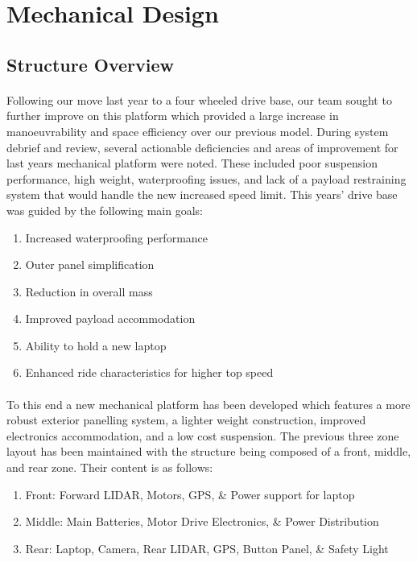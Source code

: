 \section{Mechanical Design}

\subsection{Structure Overview}
\paragraph{}
Following our move last year to a four wheeled drive base, our team sought to further improve on this platform which provided a large increase in manoeuvrability and space efficiency over our previous model. During system debrief and review, several actionable deficiencies and areas of improvement for last years mechanical platform were noted. These included poor suspension performance, high weight, waterproofing issues, and lack of a payload restraining system that would handle the new increased speed limit. This years' drive base was guided by the following main goals:

\begin{enumerate}
\item Increased waterproofing performance
\item Outer panel simplification
\item Reduction in overall mass
\item Improved payload accommodation
\item Ability to hold a new laptop
\item Enhanced ride characteristics for higher top speed
\end{enumerate}

\paragraph{}
To this end a new mechanical platform has been developed which features a more robust exterior panelling system, a lighter weight construction, improved electronics accommodation, and a low cost suspension. The previous three zone layout has been maintained with the structure being composed of a front, middle, and rear zone. Their content is as follows:

\begin{enumerate}
\item Front: Forward LIDAR, Motors, GPS, \& Power support for laptop
\item Middle: Main Batteries, Motor Drive Electronics, \& Power Distribution
\item Rear: Laptop, Camera, Rear LIDAR, GPS, Button Panel, \& Safety Light
\end{enumerate}

